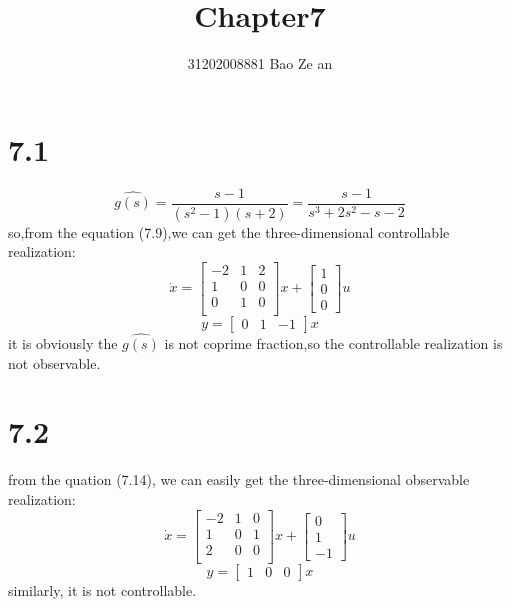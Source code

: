 \documentclass{article}
\title{Chapter7}
\author{31202008881        \quad \quad \quad
          Bao Ze an}
\begin{document}
\setlength{\parindent}{0em}
\maketitle

\section*{7.1}
\[\hat{g(s)}=\frac{s-1}{(s^2-1)(s+2)}=\frac{s-1}{s^3+2s^2-s-2}\]
so,from the equation (7.9),we can get the three-dimensional controllable realization:\\
\[
\dot{x}=
\left[
\begin{array}{ccc}
-2 & 1 & 2\\
1 & 0 & 0\\
0 & 1 & 0\\
\end{array}    
\right]x+
\left[
    \begin{array}{c}
    1\\
    0\\
    0
    \end{array}
\right]u
\]
\[
    y=\left[
        \begin{array}{ccc}
            0 & 1 & -1
        \end{array}
        \right]x    
\]
it is obviously the $\hat{g(s)}$ is not coprime fraction,so the controllable realization is not observable.

\section*{7.2}
from the quation (7.14), we can easily get the three-dimensional observable realization:\\
\[
\dot{x}=
\left[
\begin{array}{ccc}
-2 & 1 & 0\\
1 & 0 & 1\\
2 & 0 & 0\\
\end{array}    
\right]x+
\left[
    \begin{array}{c}
    0\\
    1\\
    -1
    \end{array}
\right]u
\]
\[
    y=\left[
        \begin{array}{ccc}
            1 & 0 & 0
        \end{array}
        \right]x    
\]
similarly, it is not controllable.
\end{document}
